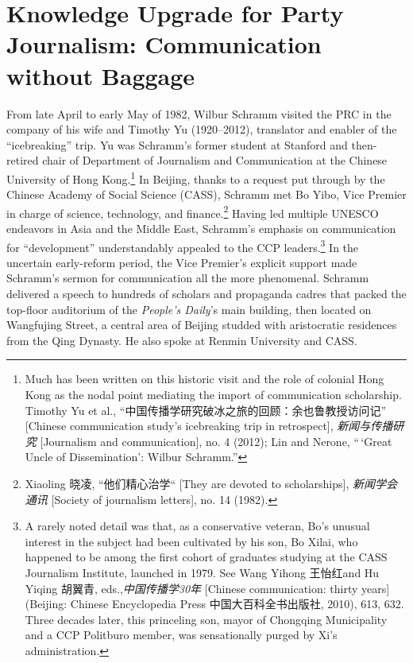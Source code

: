 \documentclass{tufte-handout}
\begin{document}
\hypertarget{knowledge-upgrade-for-party-journalism-communication-without-baggage}{%
\section{Knowledge Upgrade for Party Journalism: Communication
\\\noindent without
Baggage}\label{knowledge-upgrade-for-party-journalism-communication-without-baggage}}

\begin{CJK*}{UTF8}{gbsn} 

From late April to early May of 1982, Wilbur Schramm visited the PRC in
the company of his wife and Timothy Yu (1920--2012), translator and
enabler of the ``icebreaking'' trip. Yu was Schramm's former student at
Stanford and then-retired chair of Department of Journalism and
Communication at the Chinese University of Hong Kong.\footnote{Much has
  been written on this historic visit and the role of colonial Hong Kong
  as the nodal point mediating the import of communication scholarship.
  Timothy Yu et al., ``中国传播学研究破冰之旅的回顾：余也鲁教授访问记''
  {[}Chinese communication study's icebreaking trip in retrospect{]},
  \emph{新闻与传播研究} {[}Journalism and communication{]}, no. 4
  (2012); Lin and Nerone, ``\,`Great Uncle of Dissemination': Wilbur
  Schramm.''} In Beijing, thanks to a request put through by the Chinese
Academy of Social Science (CASS), Schramm met Bo Yibo, Vice Premier in
charge of science, technology, and finance.\footnote{Xiaoling 晓凌,
  ``他们精心治学`` {[}They are devoted to scholarships{]},
  \emph{新闻学会通讯} {[}Society of journalism letters{]}, no. 14
  (1982).} Having led multiple UNESCO endeavors in Asia and the Middle
East, Schramm's emphasis on communication for ``development''
understandably appealed to the CCP leaders.\footnote{A rarely noted
  detail was that, as a conservative veteran, Bo's unusual interest in
  the subject had been cultivated by his son, Bo Xilai, who happened to
  be among the first cohort of graduates studying at the CASS Journalism
  Institute, launched in 1979. See Wang Yihong 王怡红and Hu Yiqing
  胡翼青, eds.,\emph{中国传播学30年} {[}Chinese communication: thirty
  years{]} (Beijing: Chinese Encyclopedia Press 中国大百科全书出版社,
  2010), 613, 632. Three decades later, this princeling son, mayor of
  Chongqing Municipality and a CCP Politburo member, was sensationally
  purged by Xi's administration.} In the uncertain early-reform period,
the Vice Premier's explicit support made Schramm's sermon for
communication all the more phenomenal. Schramm delivered a speech to
hundreds of scholars and propaganda cadres that packed the top-floor
auditorium of the \emph{People's Daily}'s main building, then located on
Wangfujing Street, a central area of Beijing studded with aristocratic
residences from the Qing Dynasty. He also spoke at Renmin University and
CASS.


\end{CJK*}
\end{document}
